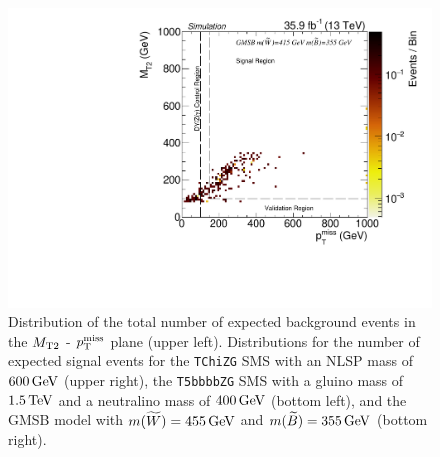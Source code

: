 \begin{figure}[tbp]
 \includegraphics[width=\pairwidth]{figures/plots_2d/DataMC_sameHistograms_LL+signal_onZ__LL__MetMt2_SIG_gmsb_415_355_}
 \caption{Distribution of the total number of expected background events in the $M_{\mathrm{T2}}$ - $p_{\mathrm{T}}^\text{miss}$ plane (upper left). Distributions for the number of expected signal events for the \texttt{TChiZG} SMS with an NLSP mass of $600\,\text{Ge\hspace{-.08em}V}$ (upper right), the \texttt{T5bbbbZG} SMS with a gluino mass of $1.5\,\text{Te\hspace{-.08em}V}$ and a neutralino mass of $400\,\text{Ge\hspace{-.08em}V}$ (bottom left), and the GMSB model with $m(\widetilde{W})=455\,\text{Ge\hspace{-.08em}V}$ and $m(\widetilde{B})=355\,\text{Ge\hspace{-.08em}V}$ (bottom right).}
 \label{fig:Regions2}
\end{figure}



